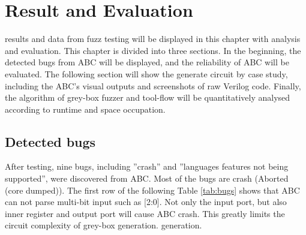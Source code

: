 \chapter{Result and Evaluation}
\renewcommand{\baselinestretch}{\mystretch}
\label{chap:Result}
results and data from fuzz testing will be displayed in this chapter with analysis and evaluation. This chapter is divided into three sections. In the beginning, the detected bugs from ABC will be displayed, and the reliability of ABC will be evaluated. The following section will show the generate circuit by case study, including the ABC's visual outputs and screenshots of raw Verilog code. Finally, the algorithm of grey-box fuzzer and tool-flow will be quantitatively analysed according to runtime and space occupation.

\section{Detected bugs}
After testing, nine bugs, including ''crash'' and ''languages features not being supported'', were discovered from ABC. Most of the bugs are crash (Aborted (core dumped)). The first row of the following Table \ref{tab:bugs} shows that ABC can not parse multi-bit input such as [2:0]. Not only the input port, but also inner register and output port will cause ABC crash. This greatly limits the circuit complexity of grey-box generation. generation. 

